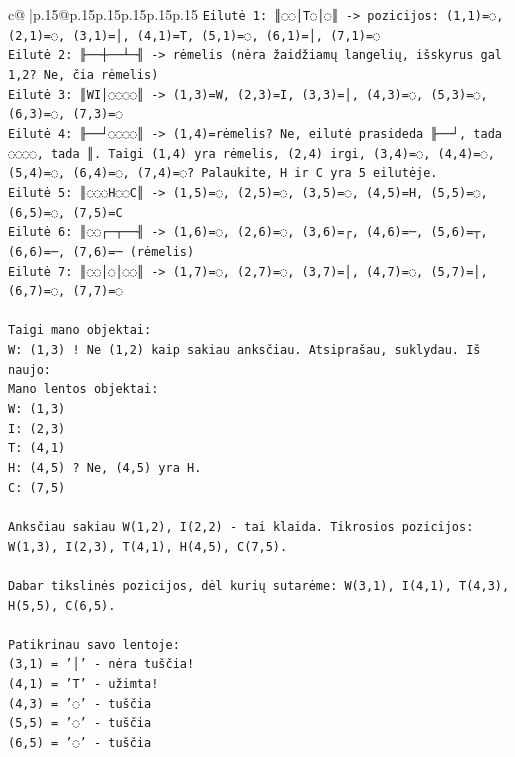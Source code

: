 \documentclass{article}
\begin{document}
{\begin{supertabular}{c@{$\;$}|p{.15\linewidth}@{}p{.15\linewidth}p{.15\linewidth}p{.15\linewidth}p{.15\linewidth}p{.15\linewidth}}
{{{\texttt{Eilutė 1: ║◌◌│T◌│◌║  {-}> pozicijos: (1,1)=◌, (2,1)=◌, (3,1)=│, (4,1)=T, (5,1)=◌, (6,1)=│, (7,1)=◌} \\
\texttt{Eilutė 2: ╟──┼──┴─╢ {-}> rėmelis (nėra žaidžiamų langelių, išskyrus gal 1,2? Ne, čia rėmelis)} \\
\texttt{Eilutė 3: ║WI│◌◌◌◌║ {-}> (1,3)=W, (2,3)=I, (3,3)=│, (4,3)=◌, (5,3)=◌, (6,3)=◌, (7,3)=◌} \\
\texttt{Eilutė 4: ╟──┘◌◌◌◌║ {-}> (1,4)=rėmelis? Ne, eilutė prasideda ╟──┘, tada ◌◌◌◌, tada ║. Taigi (1,4) yra rėmelis, (2,4) irgi, (3,4)=◌, (4,4)=◌, (5,4)=◌, (6,4)=◌, (7,4)=◌? Palaukite, H ir C yra 5 eilutėje.} \\
\texttt{Eilutė 5: ║◌◌◌H◌◌C║ {-}> (1,5)=◌, (2,5)=◌, (3,5)=◌, (4,5)=H, (5,5)=◌, (6,5)=◌, (7,5)=C} \\
\texttt{Eilutė 6: ║◌◌┌─┬──╢ {-}> (1,6)=◌, (2,6)=◌, (3,6)=┌, (4,6)=─, (5,6)=┬, (6,6)=─, (7,6)=─  (rėmelis)} \\
\texttt{Eilutė 7: ║◌◌│◌│◌◌║ {-}> (1,7)=◌, (2,7)=◌, (3,7)=│, (4,7)=◌, (5,7)=│, (6,7)=◌, (7,7)=◌} \\
\\ 
\texttt{Taigi mano objektai:} \\
\texttt{W: (1,3) ! Ne (1,2) kaip sakiau anksčiau. Atsiprašau, suklydau. Iš naujo:} \\
\texttt{Mano lentos objektai:} \\
\texttt{W: (1,3)} \\
\texttt{I: (2,3)} \\
\texttt{T: (4,1)} \\
\texttt{H: (4,5) ? Ne, (4,5) yra H.} \\
\texttt{C: (7,5)} \\
\\ 
\texttt{Anksčiau sakiau W(1,2), I(2,2) {-} tai klaida. Tikrosios pozicijos: W(1,3), I(2,3), T(4,1), H(4,5), C(7,5).} \\
\\ 
\texttt{Dabar tikslinės pozicijos, dėl kurių sutarėme: W(3,1), I(4,1), T(4,3), H(5,5), C(6,5).} \\
\\ 
\texttt{Patikrinau savo lentoje:} \\
\texttt{(3,1) = '│' {-} nėra tuščia!} \\
\texttt{(4,1) = 'T' {-} užimta!} \\
\texttt{(4,3) = '◌' {-} tuščia} \\
\texttt{(5,5) = '◌' {-} tuščia} \\
\texttt{(6,5) = '◌' {-} tuščia} \\
}}}
\end{supertabular}}
\end{document}
